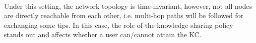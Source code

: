 \documentclass[conference]{IEEEtran}
\theoremstyle{definition}
\begin{document}
%
\vspace{-0.2 cm}
\\
Under this setting, the network topology is time-invariant, however, not all nodes are 
directly reachable from each other, i.e. multi-hop paths will be followed for exchanging 
some tips. In this case, the role of the knowledge sharing policy stands out and affects 
whether a user can/cannot attain the KC.
%
%
\end{document}
